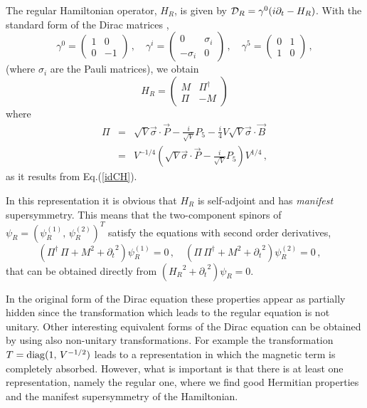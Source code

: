 \documentclass[a4paper,12pt]{article}
\begin{document}
The regular Hamiltonian 
operator, $H_{R}$, is given by ${\cal D}_{R}=\gamma^{0}(i\partial_{t}- 
H_{R})$.  
With the standard form of the Dirac matrices \cite{TH},
\begin{equation}
\gamma^{0}=\left(
\begin{array}{cc}
1&0\\
0&-1
\end{array}
\right)\,,\quad
\gamma^{i}=\left(
\begin{array}{cc}
0&\sigma_{i}\\
-\sigma_{i}&0
\end{array}
\right)\,,\quad
\gamma^{5}=\left(
\begin{array}{cc}
0&1\\
1&0
\end{array}
\right)\,,
\end{equation}
(where $\sigma_{i}$ are the Pauli matrices), we obtain 
\begin{equation}
H_{R}=\left(
\begin{array}{cc}
M&\Pi^{\dagger}\\
\Pi&-M
\end{array}\right)
\end{equation}
where 
\begin{eqnarray}\label{pili}
\Pi&=&\sqrt{V}\vec{\sigma}\cdot\vec{P}-\frac{i}{\sqrt{V}}P_{5}-
\frac{i}{4}V\sqrt{V}\vec{\sigma}\cdot\vec{B}\nonumber\\
&=&V^{-1/4}\left(\sqrt{V}\vec{\sigma}\cdot\vec{P}-\frac{i}
{\sqrt{V}}P_{5} \right)V^{1/4}\,,
\end{eqnarray}
as it results from  Eq.(\ref{idCH}). 

In this representation it is obvious that $H_{R}$ is self-adjoint  
and has {\em manifest} supersymmetry. 
This means that the two-component spinors of 
$\psi_{R}=(\psi_{R}^{(1)},\,\psi_{R}^{(2)})^{T}$ satisfy 
the equations with second order derivatives,
\begin{equation}
(\Pi^{\dagger}\,\Pi +M^2+{\partial_{t}}^{2})\psi_{R}^{(1)}=0\,,\quad
(\Pi\,\Pi^{\dagger} +M^2+{\partial_{t}}^{2})\psi_{R}^{(2)}=0\,,\quad
\end{equation}
that can be obtained directly from $({H_{R}}^2 +{\partial_{t}}^{2})\psi_{R}=0$.

In the original form of the Dirac equation these properties appear 
as partially hidden since the transformation which leads to the regular 
equation is not unitary. Other interesting equivalent forms of the Dirac 
equation can be obtained by using also non-unitary transformations. For example 
the transformation $T={\rm diag}(1,\, V^{-1/2})$ leads to a representation 
in which the magnetic term is completely absorbed. However, what is important 
is that there is at least one representation, namely the regular one, where 
we find  good  Hermitian properties and the manifest supersymmetry of the 
Hamiltonian.
\end{document}
